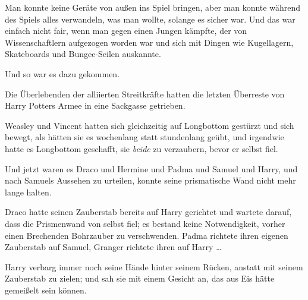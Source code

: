 Man konnte keine Geräte von außen ins Spiel bringen, aber man konnte während des Spiels alles verwandeln, was man wollte, solange es sicher war. Und das war einfach nicht fair, wenn man gegen einen Jungen kämpfte, der von Wissenschaftlern aufgezogen worden war und sich mit Dingen wie Kugellagern, Skateboards und Bungee-Seilen auskannte.

Und so war es dazu gekommen.

Die Überlebenden der alliierten Streitkräfte hatten die letzten Überreste von Harry Potters Armee in eine Sackgasse getrieben.

Weasley und Vincent hatten sich gleichzeitig auf Longbottom gestürzt und sich bewegt, als hätten sie es wochenlang statt stundenlang geübt, und irgendwie hatte es Longbottom geschafft, sie \emph{beide} zu verzaubern, bevor er selbst fiel.

Und jetzt waren es Draco und Hermine und Padma und Samuel und Harry, und nach Samuels Aussehen zu urteilen, konnte seine prismatische Wand nicht mehr lange halten.

Draco hatte seinen Zauberstab bereits auf Harry gerichtet und wartete darauf, dass die Prismenwand von selbst fiel; es bestand keine Notwendigkeit, vorher einen Brechenden Bohrzauber zu verschwenden. Padma richtete ihren eigenen Zauberstab auf Samuel, Granger richtete ihren auf Harry …

Harry verbarg immer noch seine Hände hinter seinem Rücken, anstatt mit seinem Zauberstab zu zielen; und sah sie mit einem Gesicht an, das aus Eis hätte gemeißelt sein können.

